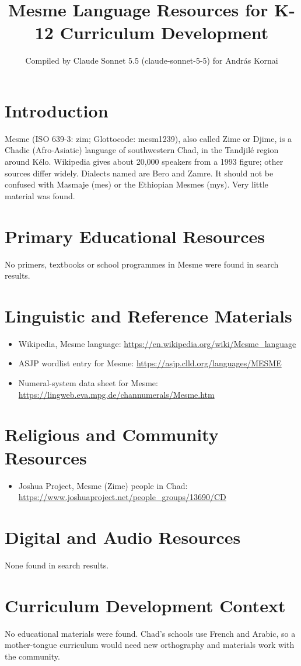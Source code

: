 \documentclass[12pt]{article}
\title{Mesme Language Resources for K-12 Curriculum Development}
\author{Compiled by Claude Sonnet 5.5 (claude-sonnet-5-5) for Andr\'as Kornai}
\date{}
\begin{document}
\maketitle

\section{Introduction}
Mesme (ISO 639-3: zim; Glottocode: mesm1239), also called Zime or Djime, is a Chadic (Afro-Asiatic) language of southwestern Chad, in the Tandjil\'e region around K\'elo. Wikipedia gives about 20,000 speakers from a 1993 figure; other sources differ widely. Dialects named are Bero and Zamre. It should not be confused with Masmaje (mes) or the Ethiopian Mesmes (mys). Very little material was found.

\section{Primary Educational Resources}
No primers, textbooks or school programmes in Mesme were found in search results.

\section{Linguistic and Reference Materials}
\begin{itemize}
\item Wikipedia, Mesme language: \url{https://en.wikipedia.org/wiki/Mesme_language}
\item ASJP wordlist entry for Mesme: \url{https://asjp.clld.org/languages/MESME}
\item Numeral-system data sheet for Mesme: \url{https://lingweb.eva.mpg.de/channumerals/Mesme.htm}
\end{itemize}

\section{Religious and Community Resources}
\begin{itemize}
\item Joshua Project, Mesme (Zime) people in Chad: \url{https://www.joshuaproject.net/people_groups/13690/CD}
\end{itemize}

\section{Digital and Audio Resources}
None found in search results.

\section{Curriculum Development Context}
No educational materials were found. Chad's schools use French and Arabic, so a mother-tongue curriculum would need new orthography and materials work with the community.
\end{document}
